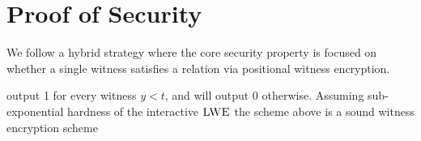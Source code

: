 \section{Proof of Security} \label{sec:secProof}
We follow a hybrid strategy where
the core security property is focused on whether a single witness satisfies a relation via positional witness encryption.

output 1 for every witness $y < t$, and will output $0$ otherwise.
\BT 
Assuming sub-exponential hardness of the interactive $\textsc{LWE}$ the scheme above is a sound witness encryption scheme

